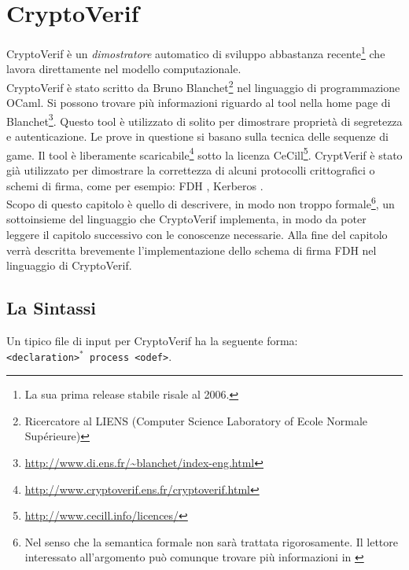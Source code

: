 \documentclass[a4paper,openright,twoside,12pt]{report}
\begin{document}
\chapter{CryptoVerif}
CryptoVerif \`e un \emph{dimostratore} automatico di sviluppo abbastanza recente\footnote{La sua prima release stabile risale al 2006.} che lavora direttamente nel modello computazionale.\\
CryptoVerif \`e stato scritto da Bruno Blanchet\footnote{Ricercatore al LIENS (Computer Science Laboratory of Ecole Normale Supérieure)} nel linguaggio di programmazione OCaml. 
Si possono trovare pi\`u informazioni riguardo al tool nella home page di Blanchet\footnote{\url{http://www.di.ens.fr/~blanchet/index-eng.html}}.
Questo tool \`e utilizzato di solito per dimostrare propriet\`a di segretezza e autenticazione. Le prove in questione  si basano sulla tecnica delle sequenze di game.
Il tool \`e liberamente scaricabile\footnote{\url{http://www.cryptoverif.ens.fr/cryptoverif.html}} sotto la licenza CeCill\footnote{\url{http://www.cecill.info/licences/}}.
CryptVerif \`e stato gi\`a utilizzato per dimostrare la correttezza di alcuni protocolli crittografici o schemi di firma, come per esempio: FDH \cite{BlanchetPointchevalCrypto06}, 
Kerberos \cite{BlanchetJaggardScedrovTsayAsiaCCS08}.\\
Scopo di questo capitolo \`e quello di descrivere, in modo non troppo formale\footnote{Nel senso che la semantica formale non sar\`a trattata rigorosamente. Il lettore interessato all'argomento pu\`o comunque trovare pi\`u informazioni in \cite{BlanchetJaggardScedrovTsayAsiaCCS08}}, 
un sottoinsieme del linguaggio che CryptoVerif implementa, in modo 
da poter leggere il capitolo successivo con le conoscenze necessarie.
Alla fine del capitolo verr\`a descritta brevemente l'implementazione dello schema di firma FDH nel linguaggio di CryptoVerif.
\newpage
\section{La Sintassi}
Un tipico file di input per CryptoVerif ha la seguente forma: \\
\verb!<declaration>!$^{*}$\verb! process <odef>!.
                                                       
\end{document}
